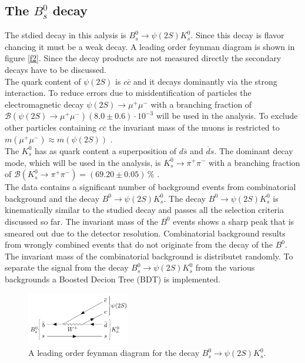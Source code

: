 \subsection{The $B_s^0$ decay}
The stdied decay in this aalysis is $B_s^0 \rightarrow \psi(2S) K_s^0$. Since this decay is flavor chancing it must be a weak decay. 
A leading order feynman diagram is shown in figure \ref{f2}. Since the decay products are not measured directly the secondary decays have to be discussed. \\
The quark content of $\psi(2S)$ is $c \overline{c}$ and it decays dominantly via the strong interaction. To reduce errors due to misidentification of 
particles the electromagnetic decay $\psi(2S) \rightarrow \mu^+ \mu^-$ with a branching fraction of $\mathcal{B}(\psi(2S) \rightarrow \mu^+ \mu^-) 
(8.0 \pm 0.6) \cdot 10^{-3}$ \cite{pdg} will be used in the analysis. To exclude other particles containing $c\overline{c}$ 
the invariant mass of the muons is restricted to $m(\mu^+ \mu^- ) \approx m(\psi(2S))$ .\\ 
The $K_s^0$ has as quark content a superposition of $d \overline{s}$ and $\overline{d}s$. The dominant decay mode, which will be used in the analysis, 
is $K_s^0 \rightarrow \pi^+ \pi^-$ with a branching fraction of $\mathcal{B}(K_s^0 \rightarrow \pi^+ \pi^-) = (69.20 \pm 0.05) \, \%$ \cite{pdg}. \\
The data contains a significant number of background events from combinatorial background and the decay $B^0 \rightarrow \psi(2S) K_s^0$. 
The decay $B^0 \rightarrow \psi(2S) K_s^0$ is kinematically similar to the studied decay and passes all the selection criteria discussed so far. 
The invariant mass of the $B^0$ events shows a sharp peak that is smeared out due to the detector resolution. 
Combinatorial background results from wrongly combined events that do not originate from the decay of the $B^0$. The invariant mass of the 
combinatorial background is distributet randomly. 
To separate the signal from the decay $B_s^0 \rightarrow \psi(2S) K_s^0$ from the various backgrounds a Boosted Decion Tree (BDT) is implemented. 

  \begin{figure}[!htb]
    \centering
    \includegraphics[width=0.4\textwidth]{graphics/image.png}
    \caption{A leading order feynman diagram for the decay $B_s^0 \rightarrow \psi(2S) K_s^0$. \cite{sample}}
    \label{fig:lhcb}
  \end{figure}